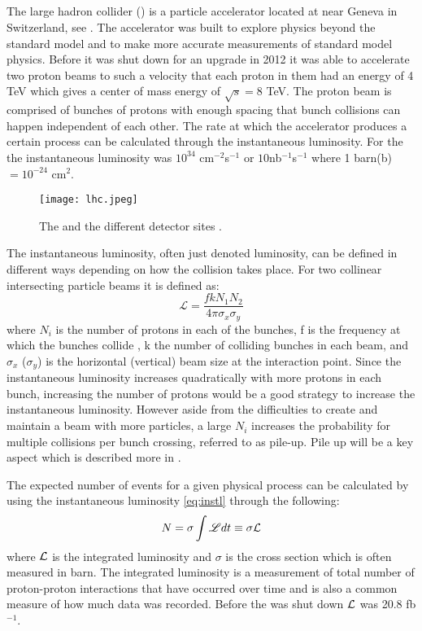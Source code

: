 \subsection{\abbrLHC}
The large hadron collider (\abbrLHC) is a particle accelerator located at \abbrCERN near Geneva in Switzerland, see . The accelerator was built to explore physics beyond the standard model and to make more accurate measurements of standard model physics. Before it was shut down for an upgrade in 2012 it was able to accelerate two proton beams to such a velocity that each proton in them had an energy of 4 TeV which gives a center of mass energy of $\sqrt{s}=8$ TeV. The proton beam is comprised of bunches of protons with enough spacing that bunch collisions can happen independent of each other. The rate at which the accelerator produces a certain process can be calculated through the instantaneous luminosity. For the \abbrLHC the instantaneous luminosity was $10^{34}$ cm$^{-2}$s$^{-1}$ \citep{lumires} or $10$nb$^{-1}$s$^{-1}$ where 1 barn(b)$=10^{-24}$ cm$^2$.
\begin{figure}[H]
\begin{center}
\texttt{[image: lhc.jpeg]}
\caption{The \abbrLHC and the different detector sites \citep{lhcimage}.}
\label{fig:lhc}
\end{center}
\end{figure}
The instantaneous luminosity, often just denoted luminosity, can be defined in different ways depending on how the collision takes place. For two collinear intersecting particle beams it is defined as:
\begin{equation}\label{eq:instl}
\mathscr{L} = \frac{fkN_1 N_2}{4\pi \sigma_x \sigma_y}
\end{equation}
where $N_i$ is the number of protons in each of the bunches, f is the frequency at which the bunches collide , k the number of colliding bunches in each beam, and $\sigma_x$ ($\sigma_y$) is the horizontal (vertical) beam size at the interaction point. Since the instantaneous luminosity increases quadratically with more protons in each bunch, increasing the number of protons would be a good strategy to increase the instantaneous luminosity. However aside from the difficulties to create and maintain a beam with more particles, a large $N_i$ increases the probability for multiple collisions per bunch crossing, referred to as pile-up. Pile up will be a key aspect which is described more in . 

The expected number of events for a given physical process can be calculated by using the instantaneous luminosity \eqref{eq:instl} through the following:
\begin{equation}\label{eq:Numevents}
N=\sigma \int \mathscr{L} dt \equiv \sigma \mathcal{L}
\end{equation}
where $\mathcal{L}$ is the integrated luminosity and $\sigma$ is the cross section which is often measured in barn.
The integrated luminosity is a measurement of total number of proton-proton interactions that have occurred over time and is also a common measure of how much data was recorded. Before the \abbrLHC was shut down $\mathcal{L}$ was 20.8 fb$^{-1}$.

